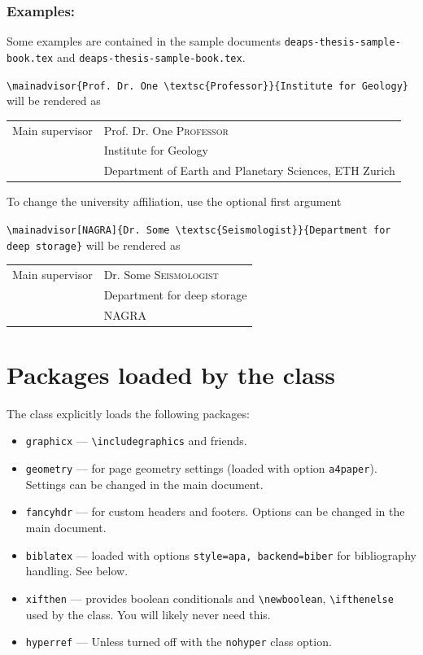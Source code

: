 \documentclass[11pt]{article}
\begin{document}
\subsubsection*{Examples:}

Some examples are contained in the sample documents \texttt{deaps-thesis-sample-book.tex} and \texttt{deaps-thesis-sample-book.tex}.

\verb|\mainadvisor{Prof. Dr. One \textsc{Professor}}{Institute for Geology}| will be rendered as
\vspace{1ex}

\begin{tabular}{p{4cm}l}
Main supervisor & Prof. Dr. One \textsc{Professor} \\
    & Institute for Geology \\
    & Department of Earth and Planetary Sciences, ETH Zurich \\    
\end{tabular}
\vspace{1ex}

To change the university affiliation, use the optional first argument

\verb|\mainadvisor[NAGRA]{Dr. Some \textsc{Seismologist}}{Department for deep storage}| will be rendered as
\vspace{1ex}

\begin{tabular}{p{4cm}l}
Main supervisor & Dr. Some \textsc{Seismologist} \\
    & Department for deep storage \\
    & NAGRA \\    
\end{tabular}


\section{Packages loaded by the class}
The class explicitly loads the following packages:
\begin{itemize}
  \item \verb|graphicx| --- \verb|\includegraphics| and friends.
  \item \verb|geometry| --- for page geometry settings (loaded with option \texttt{a4paper}). Settings can be changed
    in the main document.
  \item \verb|fancyhdr| --- for custom headers and footers. Options can be changed in the main document.
  \item \verb|biblatex| --- loaded with options \verb|style=apa, backend=biber| for bibliography handling. See below.
  \item \verb|xifthen| --- provides boolean conditionals and \verb|\newboolean|, \verb|\ifthenelse| used
   by the class. You will likely never need this.
   \item \texttt{hyperref} --- Unless turned off with the \texttt{nohyper} class option. 
\end{itemize}
\end{document}
